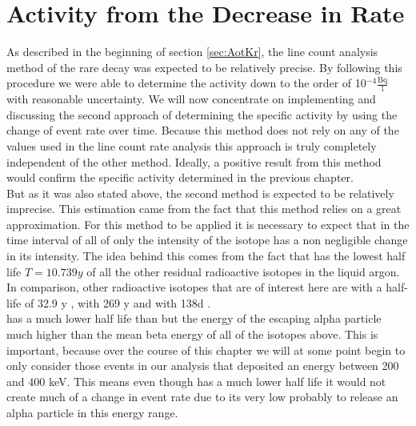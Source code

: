 \documentclass[encoding=utf8,british]{tumphthesis}
\begin{document}
\chapter{Activity from the Decrease in Rate}
\label{sec:SAfromDecrease}

As described in the beginning of section \ref{sec:AotKr}, the line count analysis method of the rare \Kr decay was expected to be relatively precise.
By following this procedure we were able to determine the activity down to the order of 10$^{-4} \frac{\mathrm{Bq}}{\mathrm{l}}$ with reasonable uncertainty.
We will now concentrate on implementing and discussing the second approach of determining the specific activity by using the change of event rate over time.
Because this method does not rely on any of the values used in the line count rate analysis this approach is truly completely independent of the other method.
Ideally, a positive result from this method would confirm the specific activity determined in the previous chapter. 
\\

But as it was also stated above, the second method is expected to be relatively imprecise.  
This estimation came from the fact that this method relies on a great approximation.
For this method to be applied it is necessary to expect that in the time interval of all of \PII only the intensity of the \Kr isotope has a non negligible change in its intensity.
The idea behind this comes from the fact that \Kr has the lowest half life \(T = 10.739\unit{y}\) of all the other residual radioactive isotopes in the liquid argon.
In comparison, other radioactive isotopes that are of interest here are  with a half-life of 32.9 y \cite{chen_nuclear_2016},  with 269 y \cite{singh_nuclear_2006} and  with 138d \cite{kondev_nuclear_2008}. 
\\

 has a much lower half life than \Kr but the energy of the escaping alpha particle much higher than the mean beta energy of all of the isotopes above.
This is important, because over the course of this chapter we will at some point begin to only consider those events in our analysis that deposited an energy between 200 and 400 keV.   
This means even though  has a much lower half life it would not create much of a change in event rate due to its very low probably to release an alpha particle in this energy range.
\\
\end{document}

